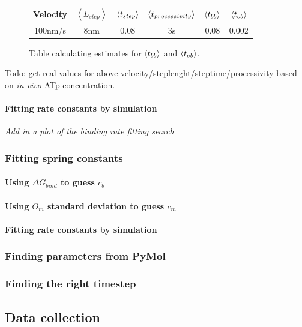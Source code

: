 \documentclass[10pt]{article} %
\begin{document}
\begin{figure}[h]
  \centering
  \begin{tabular}{| c | c | c | c | c | c |}
    \hline
    Velocity & $\left<L_{step}\right>$ & $\left<t_{step}\right>$ & $\left<t_{processivity}\right>$ & $\left<t_{bb}\right>$ & $\left<t_{ob}\right>$ \\ \hline
    100nm/s & 8nm & 0.08 & 3s & 0.08 & 0.002 \\ \hline
  \end{tabular}
  \caption{Table calculating estimates for $\left<t_{bb}\right>$ and $\left<t_{ob}\right>$.}
  \label{table:parameter-table}
\end{figure}

Todo: get real values for above velocity/steplenght/steptime/processivity based on \textit{in vivo} ATp concentration.\\

\paragraph{Fitting rate constants by simulation}
\textit{Add in a plot of the binding rate fitting search}

\subsubsection{Fitting spring constants}
\paragraph{Using $\Delta G_{bind}$ to guess $c_b$}
\paragraph{Using $\Theta_m$ standard deviation to guess $c_m$}
\paragraph{Fitting rate constants by simulation}

\subsubsection{Finding parameters from PyMol}

\subsubsection{Finding the right timestep}

\subsection{Data collection}
\end{document}
